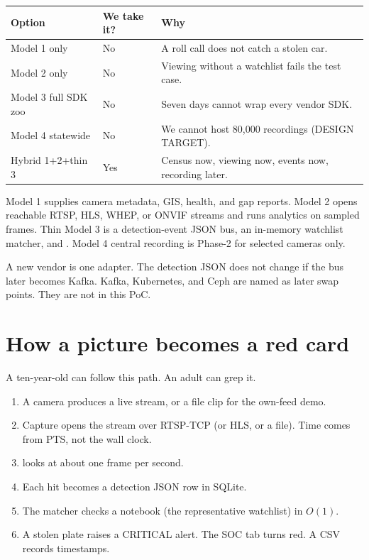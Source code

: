 \documentclass[listings]{csf301-notes}
\begin{document}
\begin{langbox}
\begin{tabular}{@{}llp{}@{}}
\toprule
Option & We take it? & Why \\
\midrule
Model 1 only & No & A roll call does not catch a stolen car. \\
Model 2 only & No & Viewing without a watchlist fails the test case. \\
Model 3 full SDK zoo & No & Seven days cannot wrap every vendor SDK. \\
Model 4 statewide & No & We cannot host 80{,}000 recordings (DESIGN TARGET). \\
Hybrid 1+2+thin 3 & Yes & Census now, viewing now, events now, recording later. \\
\bottomrule
\end{tabular}
\end{langbox}

\begin{definition}
Model 1 supplies camera metadata, GIS, health, and gap reports. Model 2 opens reachable RTSP, HLS, WHEP, or ONVIF streams and runs analytics on sampled frames. Thin Model 3 is a detection-event JSON bus, an in-memory watchlist matcher, and . Model 4 central recording is Phase-2 for selected cameras only.
\end{definition}

A new vendor is one adapter. The detection JSON does not change if the bus later becomes Kafka. Kafka, Kubernetes, and Ceph are named as later swap points. They are not in this PoC.

\section{How a picture becomes a red card}
A ten-year-old can follow this path. An adult can grep it.

\begin{center}\resizebox{0.98\textwidth}{!}{}\end{center}

\begin{enumerate}
\item A camera produces a live stream, or a file clip for the own-feed demo.
\item Capture opens the stream over RTSP-TCP (or HLS, or a file). Time comes from PTS, not the wall clock.
\item {} looks at about one frame per second.
\item Each hit becomes a detection JSON row in SQLite.
\item The matcher checks a notebook (the representative watchlist) in $O(1)$.
\item A stolen plate raises a CRITICAL alert. The SOC tab turns red. A CSV records timestamps.
\end{enumerate}
\end{document}
